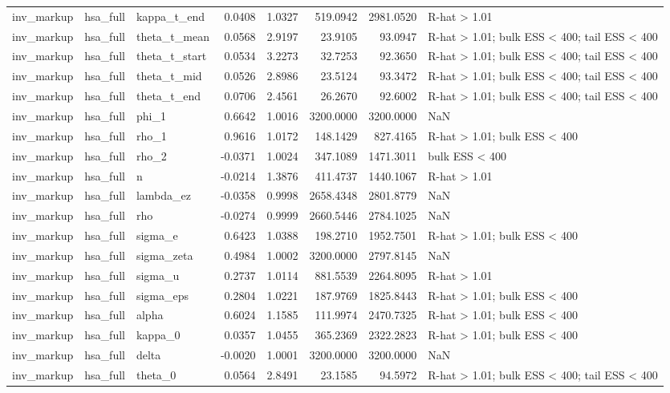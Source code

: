 \begin{tabular}{lllrrrrl}
inv\_markup & hsa\_full & kappa\_t\_end & 0.0408 & 1.0327 & 519.0942 & 2981.0520 & R-hat > 1.01 \\
inv\_markup & hsa\_full & theta\_t\_mean & 0.0568 & 2.9197 & 23.9105 & 93.0947 & R-hat > 1.01; bulk ESS < 400; tail ESS < 400 \\
inv\_markup & hsa\_full & theta\_t\_start & 0.0534 & 3.2273 & 32.7253 & 92.3650 & R-hat > 1.01; bulk ESS < 400; tail ESS < 400 \\
inv\_markup & hsa\_full & theta\_t\_mid & 0.0526 & 2.8986 & 23.5124 & 93.3472 & R-hat > 1.01; bulk ESS < 400; tail ESS < 400 \\
inv\_markup & hsa\_full & theta\_t\_end & 0.0706 & 2.4561 & 26.2670 & 92.6002 & R-hat > 1.01; bulk ESS < 400; tail ESS < 400 \\
inv\_markup & hsa\_full & phi\_1 & 0.6642 & 1.0016 & 3200.0000 & 3200.0000 & NaN \\
inv\_markup & hsa\_full & rho\_1 & 0.9616 & 1.0172 & 148.1429 & 827.4165 & R-hat > 1.01; bulk ESS < 400 \\
inv\_markup & hsa\_full & rho\_2 & -0.0371 & 1.0024 & 347.1089 & 1471.3011 & bulk ESS < 400 \\
inv\_markup & hsa\_full & n & -0.0214 & 1.3876 & 411.4737 & 1440.1067 & R-hat > 1.01 \\
inv\_markup & hsa\_full & lambda\_ez & -0.0358 & 0.9998 & 2658.4348 & 2801.8779 & NaN \\
inv\_markup & hsa\_full & rho & -0.0274 & 0.9999 & 2660.5446 & 2784.1025 & NaN \\
inv\_markup & hsa\_full & sigma\_e & 0.6423 & 1.0388 & 198.2710 & 1952.7501 & R-hat > 1.01; bulk ESS < 400 \\
inv\_markup & hsa\_full & sigma\_zeta & 0.4984 & 1.0002 & 3200.0000 & 2797.8145 & NaN \\
inv\_markup & hsa\_full & sigma\_u & 0.2737 & 1.0114 & 881.5539 & 2264.8095 & R-hat > 1.01 \\
inv\_markup & hsa\_full & sigma\_eps & 0.2804 & 1.0221 & 187.9769 & 1825.8443 & R-hat > 1.01; bulk ESS < 400 \\
inv\_markup & hsa\_full & alpha & 0.6024 & 1.1585 & 111.9974 & 2470.7325 & R-hat > 1.01; bulk ESS < 400 \\
inv\_markup & hsa\_full & kappa\_0 & 0.0357 & 1.0455 & 365.2369 & 2322.2823 & R-hat > 1.01; bulk ESS < 400 \\
inv\_markup & hsa\_full & delta & -0.0020 & 1.0001 & 3200.0000 & 3200.0000 & NaN \\
inv\_markup & hsa\_full & theta\_0 & 0.0564 & 2.8491 & 23.1585 & 94.5972 & R-hat > 1.01; bulk ESS < 400; tail ESS < 400 \\

\end{tabular}
